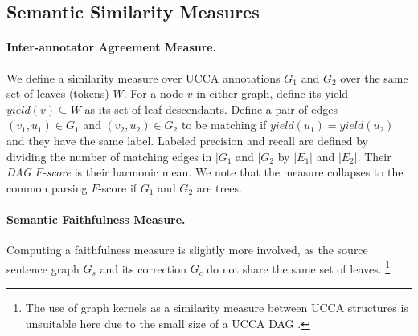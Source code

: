 \documentclass[letter,11pt]{article}
\begin{document}




\subsection{Semantic Similarity Measures}

\paragraph{Inter-annotator Agreement Measure.} We define a similarity measure over UCCA annotations 
$G_1$ and $G_2$ over the same set of leaves (tokens) $W$.
For a node $v$ in either graph, define its yield $yield(v) \subseteq W$ as its
set of leaf descendants.
Define a pair of edges $(v_1,u_1) \in G_1$ and $(v_2,u_2) \in G_2$ to be matching
if $yield(u_1) = yield(u_2)$ and they have the same label.
Labeled precision and recall are defined by dividing the number of matching edges
in $|G_1$ and $|G_2$ by $|E_1|$ and $|E_2|$. Their {\it DAG $F$-score} is their harmonic mean.
We note that the measure collapses to the common parsing $F$-score if $G_1$ and $G_2$ are trees.

\paragraph{Semantic Faithfulness Measure.} Computing a faithfulness
measure is slightly more involved, as the source sentence graph $G_s$ and its
correction $G_c$ do not share the same set of leaves.
\footnote{The use of graph kernels as a similarity measure between UCCA 
  structures is unsuitable here due to the small size of a UCCA DAG \cite{kashima2003marginalized}.} 
\end{document}
